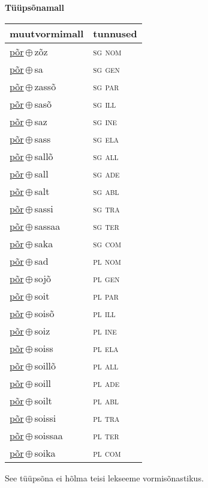 

\vspace{3.5em}
\noindent \begin{minipage}{\textwidth}
\noindent \textbf{Tüüpsõnamall \,}\\

\begin{sideways}
\begin{tabular}{l l}
muutvormimall & tunnused \\
\hline
\underline{põr}\,$\oplus$\,zõz & \textsc{ sg nom } \\
\underline{põr}\,$\oplus$\,sa & \textsc{ sg gen } \\
\underline{põr}\,$\oplus$\,zassõ & \textsc{ sg par } \\
\underline{põr}\,$\oplus$\,sasõ & \textsc{ sg ill } \\
\underline{põr}\,$\oplus$\,saz & \textsc{ sg ine } \\
\underline{põr}\,$\oplus$\,sass & \textsc{ sg ela } \\
\underline{põr}\,$\oplus$\,sallõ & \textsc{ sg all } \\
\underline{põr}\,$\oplus$\,sall & \textsc{ sg ade } \\
\underline{põr}\,$\oplus$\,salt & \textsc{ sg abl } \\
\underline{põr}\,$\oplus$\,sassi & \textsc{ sg tra } \\
\underline{põr}\,$\oplus$\,sassaa & \textsc{ sg ter } \\
\underline{põr}\,$\oplus$\,saka & \textsc{ sg com } \\
\underline{põr}\,$\oplus$\,sad & \textsc{ pl nom } \\
\underline{põr}\,$\oplus$\,sojõ & \textsc{ pl gen } \\
\underline{põr}\,$\oplus$\,soit & \textsc{ pl par } \\
\underline{põr}\,$\oplus$\,soisõ & \textsc{ pl ill } \\
\underline{põr}\,$\oplus$\,soiz & \textsc{ pl ine } \\
\underline{põr}\,$\oplus$\,soiss & \textsc{ pl ela } \\
\underline{põr}\,$\oplus$\,soillõ & \textsc{ pl all } \\
\underline{põr}\,$\oplus$\,soill & \textsc{ pl ade } \\
\underline{põr}\,$\oplus$\,soilt & \textsc{ pl abl } \\
\underline{põr}\,$\oplus$\,soissi & \textsc{ pl tra } \\
\underline{põr}\,$\oplus$\,soissaa & \textsc{ pl ter } \\
\underline{põr}\,$\oplus$\,soika & \textsc{ pl com } \\
\end{tabular}
\end{sideways}
\label{tab:tüüpsõnamall-põrzõz}

\end{minipage}

 
\vspace{1em}
\noindent See tüüpsõna ei hõlma teisi lekseeme vormi\-sõnastikus.
